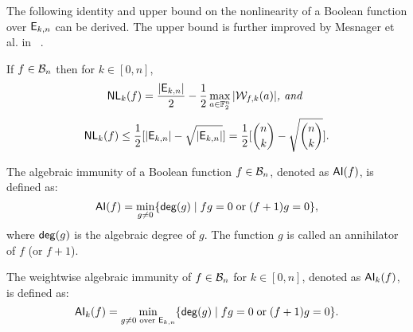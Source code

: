 \documentclass{llncs}
\begin{document}
The following identity and upper bound on the nonlinearity of a Boolean function over $\mathsf{E}_{k,n}$ can be derived. The upper bound is further improved by Mesnager et al. in ~\cite{CC:MesZhoDin19}.
\begin{lemma}\label{lem:wnl}
If $f \in \mathcal{B}_n$ then for $k \in [0,n]$, 
\[\mathsf{NL}_{k}(f) = \frac{|\mathsf{E}_{k,n}|}{2}- \frac{1}{2}\max_{a \in \mathbb{F}_2^n} |\mathcal{W}_{f,k}(a)| \textit{, and } \]
\[\mathsf{NL}_{k}(f) \leq \frac{1}{2} [|\mathsf{E}_{k,n}| - \sqrt{|\mathsf{E}_{k,n}|}] = \frac{1}{2} [{n \choose k} - \sqrt{{n \choose k}}].\]
\end{lemma}

\begin{definition} \label{def:ai}
The algebraic immunity of a Boolean function $f\in \mathcal{B}_{n}$, denoted as $\mathsf{AI}(f)$, is defined as:
\[ \mathsf{AI}(f) = \min_{g \neq 0}\{ \mathsf{deg}(g) \; | \; fg = 0 \; \text{or} \; (f + 1)g = 0 \}{,} \]
where $\mathsf{deg}(g)$ is the algebraic degree of $g$.
The function $g$ is called an annihilator of $f$ (or $f + 1$).

The weightwise algebraic immunity of $f\in \mathcal{B}_{n}$ for $k\in [0,n]$, denoted as $\mathsf{AI}_k(f)$, is defined as:
\[ \mathsf{AI}_{k}(f) = \min_{g \neq 0 \text{ over } \mathsf{E}_{k,n}}\{ \mathsf{deg}(g) \; | \; fg = 0 \; \text{or} \; (f + 1)g = 0 \}{.} \]	
\end{definition}
\end{document}
